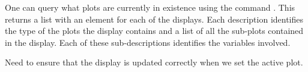 \documentclass{article}
\begin{document}
One can query what plots are currently in existence using the command
.  This returns a list with an element
for each of the displays. Each description identifies the type of the
plots the display contains and a list of all the sub-plots contained
in the display. Each of these sub-descriptions identifies the
variables involved.



{\red Need to ensure that the display is updated correctly when
we set the active plot.}
\end{document}
